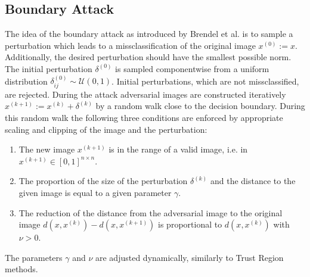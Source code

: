 \documentclass{article}
\begin{document}
\subsection{Boundary Attack}

The idea of the boundary attack as introduced by Brendel et
al.  is to sample a perturbation which leads to a
missclassification of the original image $x^{(0)}:=x$. Additionally,
the desired perturbation should have the smallest possible norm. The
initial perturbation $\delta^{(0)}$ is sampled component\-wise from a
uniform distribution $\delta^{(0)}_{ij}\sim \mathcal{U}(0,1)$. Initial
perturbations, which are not missclassified, are rejected. During the
attack adversarial images are constructed iteratively
$x^{(k+1)}:= x^{(k)}+\delta^{(k)}$ by a random walk close to the
decision boundary. During this random walk the following three
conditions are enforced by appropriate scaling and clipping of the
image and the perturbation:
\begin{enumerate}
\item The new image $x^{(k+1)}$ is in the range of a valid image,
  i.e. in $x^{(k+1)}\in [0,1]^{n\times n}$.
\item The proportion of the size of the perturbation $\delta^{(k)}$
  and the distance to the given image is equal to a given parameter
  $\gamma$.
\item The reduction of the distance from the adversarial image to the
  original image $d(x, x^{(k)})-d(x, x^{(k+1)})$ is proportional to
  $d(x, x^{(k)})$ with $\nu>0$.
\end{enumerate}
The parameters $\gamma$ and $\nu$ are adjusted dynamically, similarly to Trust Region methods.
\end{document}
